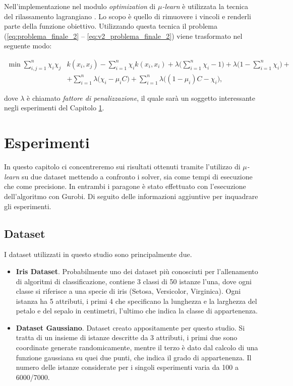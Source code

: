 \documentclass[a4paper,12pt]{report}
\begin{document}
Nell'implementazione nel modulo \textit{optimization} di \textit{$\mu$-learn} \cite{mulearn_documentation} è utilizzata la tecnica del rilassamento lagrangiano \cite{lagrangian_relaxation}. Lo scopo è quello di rimuovere i vincoli e renderli parte della funzione obiettivo. Utilizzando questa tecnica il problema (\ref{eq:problema_finale_2} -- \ref{eq:v2_problema_finale_2}) viene trasformato nel seguente modo:

\begin{equation*}
    \begin{split}
        \min \displaystyle\sum_{i,j=1}^{n}\chi_i\chi_j &k(x_i,x_j) - \displaystyle\sum_{i=1}^{n}\chi_ik(x_i,x_i)+ \lambda\Big(\displaystyle\sum_{i=1}^{n}\chi_i -1\Big) + \lambda\Big(1 - \displaystyle\sum_{i=1}^{n}\chi_i\Big) + \\
        &+ \displaystyle\sum_{i=1}^{n}\lambda\Big(\chi_i-\mu_iC\Big) + \displaystyle\sum_{i=1}^{n}\lambda\Big((1 -\mu_i)C - \chi_i\Big),       
    \end{split}
\end{equation*}

\noindent dove $\lambda$ è chiamato \textit{fattore di penalizzazione}, il quale sarà un soggetto interessante negli esperimenti del Capitolo \ref{Captiolo 3}.


%

\chapter{Esperimenti}
\label{Captiolo 3}
In questo capitolo ci concentreremo sui risultati ottenuti tramite l'utilizzo di \textit{$\mu$-learn} su due dataset mettendo a confronto i solver, sia come tempi di esecuzione che come precisione. In entrambi i paragone è stato effettuato con l'esecuzione dell'algoritmo con Gurobi. Di seguito delle informazioni aggiuntive per inquadrare gli esperimenti.


\section{Dataset}
I dataset utilizzati in questo studio sono principalmente due.
\begin{itemize}
    \item \textbf{Iris Dataset}. Probabilmente uno dei dataset più conosciuti per l'allenamento di algoritmi di classificazione, contiene 3 classi di 50 istanze l'una, dove ogni classe si riferisce a una specie di iris (Setosa, Versicolor, Virginica). Ogni istanza ha 5 attributi, i primi 4 che specificano la lunghezza e la larghezza del petalo e del sepalo in centimetri, l'ultimo che indica la classe di appartenenza. 
    \item \textbf{Dataset Gaussiano}. Dataset creato appositamente per questo studio. Si tratta di un insieme di istanze descritte da 3 attributi, i primi due sono coordinate generate randomicamente, mentre il terzo è dato dal calcolo di una funzione gaussiana su quei due punti, che indica il grado di appartenenza. Il numero delle istanze considerate per i singoli esperimenti varia da 100 a 6000/7000.
\end{itemize}
\end{document}
